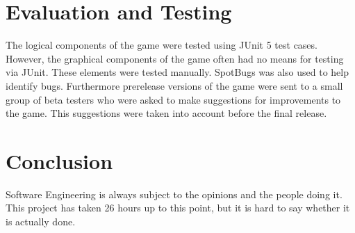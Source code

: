 \documentclass[12pt]{article}
\begin{document}
\section*{Evaluation and Testing}
The logical components of the game were tested using JUnit 5 test cases.  However, the graphical components of the game often had no means for testing via JUnit.  These elements were tested manually.  SpotBugs was also used to help identify bugs.  Furthermore prerelease versions of the game were sent to a small group of beta testers who were asked to make suggestions for improvements to the game.  This suggestions were taken into account before the final release.

\section*{Conclusion}
Software Engineering is always subject to the opinions and the people doing it.  This project has taken 26 hours up to this point, but it is hard to say whether it is actually done.
\end{document}
